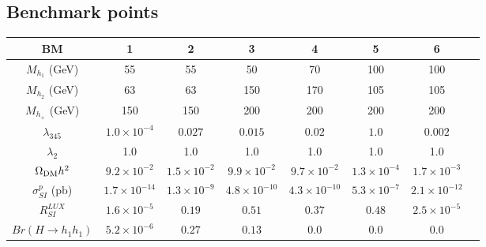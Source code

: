 \documentclass[12pt,a4paper]{article}
\newcommand {\blue} {\color{blue}}
\newcommand{\giac}[2]{{\blue #1 #2}}
\begin{document}


\subsection{Benchmark points}

\begin{table}[htb]
\centering
\begin{tabular}{|c||c|c|c|c|c|c|c|}
\hline
 {\bf BM}                       &  {\bf 1}  		& {\bf 2}  	   	   & {\bf 3}  		& {\bf 4}  		    & {\bf 5}     	    &  {\bf 6}  \\
  \hline\hline 
  $M_{h_{1}}$ (GeV)     	& 55      		& 55 			& 50 		      & 70		       & 100	      	      &100 \\
  \hline
  $M_{h_{2}}$ (GeV)     	& 63      		& 63 			&150  		      & 170	       	       & 105		      &105 \\
  \hline
  $M_{h_{+}}$ (GeV)   		& 150     		& 150 			&200  	  	      & 200		       & 200	     	      &200 \\
  \hline
  $\lambda_{345}$       	& $1.0\times10^{-4}$ 	 & $0.027$  		 & $0.015$ 		& $0.02$ 		& $1.0$  		& $0.002$	   \\
  \hline
  $\lambda_{2}$         	&  1.0    		& 1.0		        & 1.0	    	      & 1.0		       & 1.0		      & 1.0 \\ 
  \hline	
  $\Omega_{\rm DM} h^2$          	& $9.2 \times 10^{-2}$  & $1.5 \times 10^{-2}$   & $9.9 \times 10^{-2}$ & $9.7 \times 10^{-2}$	& $1.3 \times 10^{-4}$  &  $1.7 \times 10^{-3}$ \\
  \hline 
  $\sigma_{SI}^p$ (pb)    	& $1.7 \times 10^{-14}$ &  $1.3 \times 10^{-9}$  & $4.8 \times 10^{-10}$& $4.3 \times 10^{-10}$ & $5.3 \times 10^{-7}$  &  $2.1 \times 10^{-12}$ \\
  $R_{SI}^{LUX}$     	        & $1.6\times 10^{-5}$   &  $0.19$		 & $0.51$  		& $0.37$  		& $0.48$  		& $2.5  \times 10^{-5} $ \\
 \hline 
  $Br(H\to h_1 h_1)$     	& $5.2\times 10^{-6}$ 	&  $0.27$  		& $0.13$  		& $0.0$  		& $0.0$		 	&  $0.0$ \\

\end{tabular}
\end{table}
\end{document}
